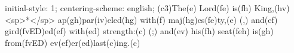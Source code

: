 initial-style: 1;
centering-scheme: english;
(c3)The(e) Lord(fe) is(fh) King,(hv) <sp>*</sp> ap(gh)par(iv)eled(hg) with(f) maj(hg)es(fe)ty,(e) (,) and(ef) gird(fvED)ed(ef) with(ed) strength:(c) (;) and(ev) his(fh) seat(feh) is(gh) from(fvED) ev(ef)er(ed)last(c)ing.(c)
